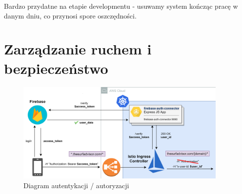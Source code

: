 Bardzo przydatne na etapie developmentu - usuwamy system kończąc pracę w danym dniu, co przynosi spore oszczędności.

\section{Zarządzanie ruchem i bezpieczeństwo}
\label{traffic}

\begin{figure}[!ht]
    
	\begin{center}
		\includegraphics[width=0.93\textwidth]{img/security-flow}
	\end{center}
    \caption{Diagram autentykacji / autoryzacji}
    \label{security-diagram}
\end{figure}

